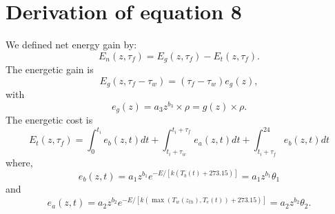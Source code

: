 \documentclass[12pt]{article}
\begin{document}
\section{Derivation of  equation 8}
We defined net energy gain by: 
\begin{equation} \label{eq:main}
	E_n(z, \tau_f) = E_g(z,\tau_f) - E_t(z, \tau_f).
\end{equation}
The energetic gain is
\[
	E_g(z,\tau_f - \tau_w) = (\tau_f - \tau_w) e_g(z),
\]
with 
\begin{equation} \label{eq:eg}
	e_g(z) = a_3 z^{b_3} \times \rho  = g(z) \times \rho.
\end{equation}
%
The energetic cost is  
\begin{equation} \label{eq:et}
	E_t(z, \tau_f) = \int_0^{t_i} e_b(z, t) dt + \int_{t_i + \tau_w}^{t_i + \tau_f } e_a(z,t) dt + \int_{t_i+\tau_f}^{24} e_b(z, t) dt 
\end{equation}
where,
\begin{equation} \label{eq:eb}
	e_b(z, t) = a_1 z^{b_1} e^{-E/[k (T_b(t)+ 273.15)]} =  a_1 z^{b_1} \theta_1 
\end{equation}
and 
\begin{equation} \label{eq:ea}
	e_a(z,t) = a_2 z^{b_2}  e^{-E/[k (\max(T_w(z_{th}), T_e(t))+ 273.15)]} =  a_2 z^{b_2} \theta_2.
\end{equation}
\end{document}
